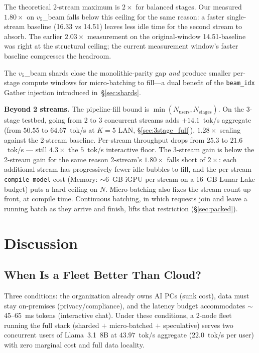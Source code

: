 \documentclass[11pt]{article}
\newcommand{\brk}{\discretionary{}{}{}}
\begin{document}
The theoretical 2-stream maximum is $2\times$ for balanced stages. Our measured $1.80\times$ on $v_5$\_beam falls below this ceiling for the same reason: a faster single-stream baseline (16.33 vs 14.51) leaves less idle time for the second stream to absorb. The earlier $2.03\times$ measurement on the original-window 14.51-baseline was right at the structural ceiling; the current measurement window's faster baseline compresses the headroom.

The $v_5$\_beam shards close the monolithic-parity gap \emph{and} produce smaller per-stage compute windows for micro-batching to fill---a dual benefit of the \texttt{beam\_idx} Gather injection introduced in~\S\ref{sec:shards}.

\textbf{Beyond 2 streams.} The pipeline-fill bound is $\min(N_\text{users}, N_\text{stages})$. On the 3-stage testbed, going from 2 to 3 concurrent streams adds $+14.1$~tok/s aggregate (from $50.55$ to $64.67$~tok/s at $K\!=\!5$ LAN, \S\ref{sec:3stage_full}), $1.28\times$ scaling against the 2-stream baseline. Per-stream throughput drops from $25.3$ to $21.6$~tok/s --- still $4.3\times$ the $5$~tok/s interactive floor. The 3-stream gain is below the 2-stream gain for the same reason 2-stream's $1.80\times$ falls short of $2\times$: each additional stream has progressively fewer idle bubbles to fill, and the per-stream \texttt{compile\_\brk model} cost (Memory: ${\sim}6$~GB iGPU per stream on a 16~GB Lunar Lake budget) puts a hard ceiling on $N$. Micro-batching also fixes the stream count up front, at compile time. Continuous batching, in which requests join and leave a running batch as they arrive and finish, lifts that restriction (\S\ref{sec:packed}).

\section{Discussion}
\label{sec:discussion}

\subsection{When Is a Fleet Better Than Cloud?}

Three conditions: the organization already owns AI PCs (sunk cost), data must stay on-premises (privacy/compliance), and the latency budget accommodates $\sim$45--65~ms tokens (interactive chat). Under these conditions, a 2-node fleet running the full stack (sharded $+$ micro-batched $+$ speculative) serves two concurrent users of Llama~3.1~8B at $43.97$~tok/s aggregate ($22.0$~tok/s per user) with zero marginal cost and full data locality.
\end{document}
